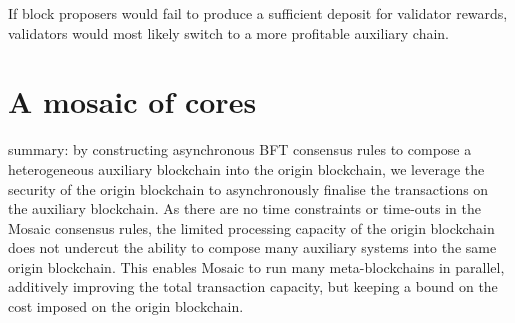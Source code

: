 \documentclass[12pt,a4paper]{article}
\begin{document}
If block proposers would fail to produce a sufficient deposit for validator rewards, validators would most likely switch to a more profitable auxiliary chain.

%
%
\section{A mosaic of cores}

summary:
by constructing asynchronous BFT consensus rules to compose a heterogeneous auxiliary blockchain into the origin blockchain, we leverage the security of the origin blockchain to asynchronously finalise the transactions on the auxiliary blockchain.
As there are no time constraints or time-outs in the Mosaic consensus rules, the limited processing capacity of the origin blockchain does not undercut the ability to compose many auxiliary systems into the same origin blockchain.
This enables Mosaic to run many meta-blockchains in parallel, additively improving the total transaction capacity, but keeping a bound on the cost imposed on the origin blockchain.
%
%
\end{document}
